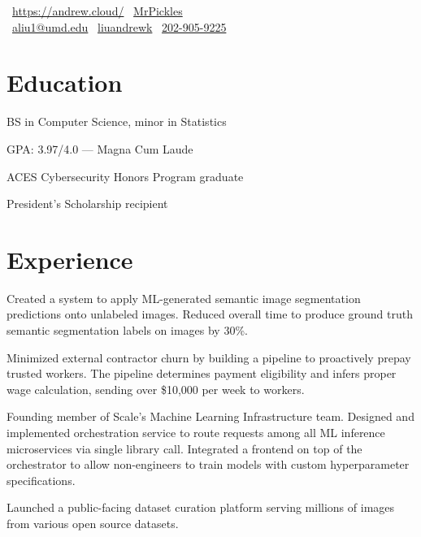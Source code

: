 \documentclass[]{template}
\begin{document}
{
  \faHome \, \url{https://andrew.cloud/}
  \textcolor{white}{\textbullet} %
  \faGithub \, \href{https://github.com/MrPickles}{MrPickles}
  \\ %
  \textcolor{white}{\textbullet} %
  \faEnvelope \, \href{mailto:aliu1@umd.edu}{aliu1@umd.edu}
  \textcolor{white}{\textbullet} %
  \faLinkedin \, \href{https://linkedin.com/in/liuandrewk}{liuandrewk}
  \textcolor{white}{\textbullet} %
  \faPhone \, \href{tel:2029059225}{202-905-9225}
}

\section{Education}

\hfill
{}
\begin{tightemize}
\item BS in Computer Science, minor in Statistics
\item GPA: 3.97/4.0 --- Magna Cum Laude
\item ACES Cybersecurity Honors Program graduate
\item President's Scholarship recipient
\end{tightemize}

\section{Experience}

\hfill
{}
\begin{tightemize}
\item
  Created a system to apply ML-generated semantic image segmentation predictions
  onto unlabeled images.
  Reduced overall time to produce ground truth semantic segmentation labels on
  images by 30\%.
\item
  Minimized external contractor churn by building a pipeline to proactively
  prepay trusted workers.
  The pipeline determines payment eligibility and infers proper wage
  calculation, sending over \$10,000 per week to workers.
\item
  Founding member of Scale's Machine Learning Infrastructure team.
  Designed and implemented orchestration service to route requests among all ML
  inference microservices via single library call.
  Integrated a frontend on top of the orchestrator to allow non-engineers to
  train models with custom hyperparameter specifications.
\item
  Launched a public-facing dataset curation platform serving millions of images
  from various open source datasets.
\item
\end{tightemize}
\end{document}
